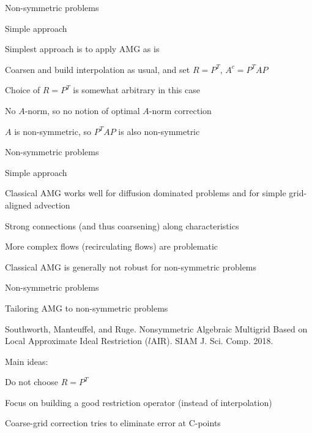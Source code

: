 \documentclass[18pt,xcolor=table]{beamer}
\begin{document}
\begin{frame}{Non-symmetric problems}
\begin{block}{Simple approach}
\bit
\item Simplest approach is to apply AMG as is
\item Coarsen and build interpolation as usual, and set $R = P^T$, $A^c = P^TAP$
\item Choice of $R = P^T$ is somewhat arbitrary in this case
\bit
\item No $A$-norm, so no notion of optimal $A$-norm correction
\item $A$ is non-symmetric, so $P^TAP$ is also non-symmetric
\eit
\eit
\end{block}
\end{frame}

\begin{frame}{Non-symmetric problems}
\begin{block}{Simple approach}
\bit
\item Classical AMG works well for diffusion dominated problems and for simple grid-aligned advection
\item Strong connections (and thus coarsening) along characteristics
\item More complex flows (recirculating flows) are problematic
\item Classical AMG is generally not robust for non-symmetric problems
\eit
\end{block}
\end{frame}

\begin{frame}{Non-symmetric problems}
\begin{block}{Tailoring AMG to non-symmetric problems}
\bit
\item Southworth, Manteuffel, and Ruge. Nonsymmetric Algebraic Multigrid Based on Local Approximate Ideal Restriction ($l$AIR). SIAM J. Sci. Comp. 2018.
\item Main ideas: 
\bit
\item Do not choose $R = P^T$
\item Focus on building a good restriction operator (instead of interpolation)
\item Coarse-grid correction tries to eliminate error at C-points
\eit
\eit
\end{block}
\end{frame}
\end{document}
